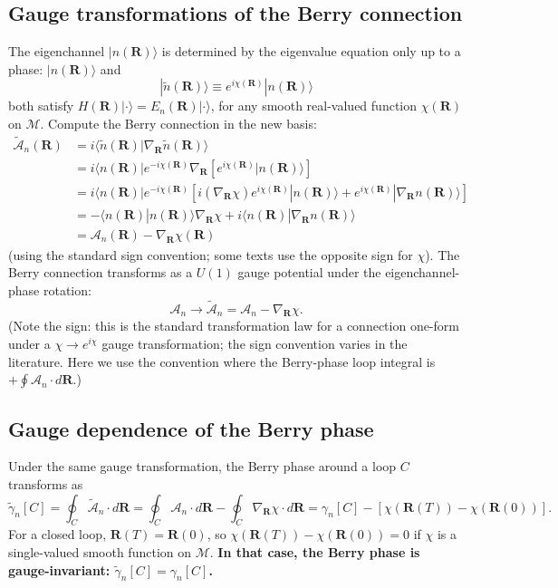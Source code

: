 \documentclass[11pt,a4paper]{article}
\begin{document}
\subsection{Gauge transformations of the Berry connection}

The eigenchannel $|n(\mathbf{R})\rangle$ is determined by the eigenvalue equation only up to a phase: $|n(\mathbf{R})\rangle$ and
\[
|\tilde n(\mathbf{R})\rangle \equiv e^{i\chi(\mathbf{R})} |n(\mathbf{R})\rangle
\]
both satisfy $H(\mathbf{R})|\cdot\rangle = E_n(\mathbf{R})|\cdot\rangle$, for any smooth real-valued function $\chi(\mathbf{R})$ on $\mathcal{M}$. Compute the Berry connection in the new basis:
\begin{align*}
\tilde{\mathcal{A}}_n(\mathbf{R}) &= i \langle \tilde n(\mathbf{R})|\nabla_\mathbf{R} \tilde n(\mathbf{R})\rangle \\
&= i \langle n(\mathbf{R})| e^{-i\chi(\mathbf{R})} \nabla_\mathbf{R} [e^{i\chi(\mathbf{R})} |n(\mathbf{R})\rangle] \\
&= i \langle n(\mathbf{R})| e^{-i\chi(\mathbf{R})} [i (\nabla_\mathbf{R} \chi) e^{i\chi(\mathbf{R})} |n(\mathbf{R})\rangle + e^{i\chi(\mathbf{R})} |\nabla_\mathbf{R} n(\mathbf{R})\rangle] \\
&= -\langle n(\mathbf{R})|n(\mathbf{R})\rangle \nabla_\mathbf{R} \chi + i \langle n(\mathbf{R})|\nabla_\mathbf{R} n(\mathbf{R})\rangle \\
&= \mathcal{A}_n(\mathbf{R}) - \nabla_\mathbf{R} \chi(\mathbf{R})
\end{align*}
(using the standard sign convention; some texts use the opposite sign for $\chi$). The Berry connection transforms as a $U(1)$ gauge potential under the eigenchannel-phase rotation:
\[
\mathcal{A}_n \to \tilde{\mathcal{A}}_n = \mathcal{A}_n - \nabla_\mathbf{R} \chi.
\]
(Note the sign: this is the standard transformation law for a connection one-form under a $\chi \to e^{i\chi}$ gauge transformation; the sign convention varies in the literature. Here we use the convention where the Berry-phase loop integral is $+\oint \mathcal{A}_n\cdot d\mathbf{R}$.)

\subsection{Gauge dependence of the Berry phase}

Under the same gauge transformation, the Berry phase around a loop $C$ transforms as
\[
\tilde\gamma_n[C] = \oint_C \tilde{\mathcal{A}}_n \cdot d\mathbf{R} = \oint_C \mathcal{A}_n \cdot d\mathbf{R} - \oint_C \nabla_\mathbf{R} \chi \cdot d\mathbf{R} = \gamma_n[C] - [\chi(\mathbf{R}(T)) - \chi(\mathbf{R}(0))].
\]
For a closed loop, $\mathbf{R}(T) = \mathbf{R}(0)$, so $\chi(\mathbf{R}(T)) - \chi(\mathbf{R}(0)) = 0$ if $\chi$ is a single-valued smooth function on $\mathcal{M}$. \textbf{In that case, the Berry phase is gauge-invariant: $\tilde\gamma_n[C] = \gamma_n[C]$.}
\end{document}
